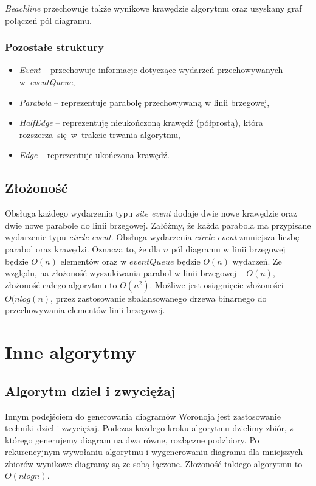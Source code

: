\documentclass[declaration,shortabstract, inz]{iithesis}
\theoremstyle{definition} \newtheorem{definition}{Definicja}[]
\theoremstyle{plain} \newtheorem{remark}[definition]{Obserwacja}
\theoremstyle{plain} \newtheorem{theorem}[definition]{Twierdzenie}
\theoremstyle{plain} \newtheorem{example}{Przykład}[definition]
\theoremstyle{plain} \newtheorem{lemma}[definition]{Lemat}
\begin{document}
\textit{Beachline} przechowuje także wynikowe krawędzie algorytmu oraz uzyskany graf połączeń pól diagramu.

\subsubsection{Pozostałe struktury}
\begin{itemize}
	\item \textit{Event} -- przechowuje informacje dotyczące wydarzeń przechowywanych w~\textit{eventQueue},
	\item \textit{Parabola} -- reprezentuje parabolę przechowywaną w linii brzegowej,
	\item \textit{HalfEdge} -- reprezentuję nieukończoną krawędź (półprostą), która rozszerza~się~w~trakcie trwania algorytmu,
	\item \textit{Edge} -- reprezentuje ukończona krawędź.
\end{itemize}

\subsection{Złożoność}
Obsługa każdego wydarzenia typu \textit{site event} dodaje dwie nowe krawędzie oraz dwie nowe parabole do linii brzegowej. Załóżmy, że każda parabola ma przypisane wydarzenie typu \textit{circle event}. Obsługa wydarzenia \textit{circle event} zmniejsza liczbę parabol oraz krawędzi. Oznacza to, że dla $n$ pól diagramu w linii brzegowej będzie $O(n)$ elementów oraz w $eventQueue$ będzie $O(n)$ wydarzeń. Ze względu, na złożoność wyszukiwania parabol w linii brzegowej -- $O(n)$, złożoność całego algorytmu to $O(n^2)$. Możliwe jest osiągnięcie złożoności $O(nlog(n)$, przez zastosowanie zbalansowanego drzewa binarnego do przechowywania elementów linii brzegowej.


\section{Inne algorytmy}

\subsection{Algorytm dziel i zwyciężaj}

Innym podejściem do generowania diagramów Woronoja jest zastosowanie techniki dziel i zwyciężaj. Podczas każdego kroku algorytmu dzielimy zbiór, z którego generujemy diagram na dwa równe, rozłączne podzbiory. Po rekurencyjnym wywołaniu algorytmu i wygenerowaniu diagramu dla mniejszych zbiorów wynikowe diagramy są ze sobą łączone. Złożoność takiego algorytmu to $O(nlogn)$.
\end{document}
